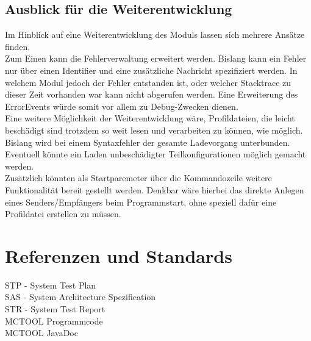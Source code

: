 \section{Ausblick für die Weiterentwicklung}
Im Hinblick auf eine Weiterentwicklung des Moduls lassen sich mehrere Ansätze finden.\\
Zum Einen kann die Fehlerverwaltung erweitert werden. Bislang kann ein Fehler nur über einen Identifier und eine zusätzliche Nachricht spezifiziert werden. In welchem Modul jedoch
der Fehler entstanden ist, oder welcher Stacktrace zu dieser Zeit vorhanden war kann nicht abgerufen werden. Eine Erweiterung des ErrorEvents würde somit vor allem zu Debug-Zwecken dienen.\\
Eine weitere Möglichkeit der Weiterentwicklung wäre, Profildateien, die leicht beschädigt sind trotzdem so weit lesen und verarbeiten zu können, wie möglich. Bislang
wird bei einem Syntaxfehler der gesamte Ladevorgang unterbunden. Eventuell könnte ein Laden unbeschädigter Teilkonfigurationen möglich gemacht werden.\\
Zusätzlich könnten als Startparemeter über die Kommandozeile weitere Funktionalität bereit gestellt werden. Denkbar wäre hierbei das direkte Anlegen eines
Senders/Empfängers beim Programmstart, ohne speziell dafür eine Profildatei erstellen zu müssen.


\chapter{Referenzen und Standards}

STP - System Test Plan\\
SAS - System Architecture Spezification\\
STR - System Test Report\\
MCTOOL Programmcode\\
MCTOOL JavaDoc
